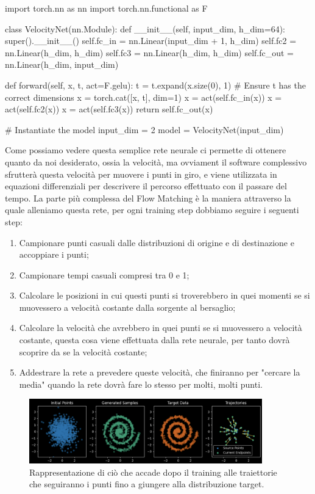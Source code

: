 \begin{python}[frame=trBL]
import torch.nn as nn
import torch.nn.functional as F

class VelocityNet(nn.Module):
    def __init__(self, input_dim, h_dim=64):
        super().__init__()
        self.fc_in  = nn.Linear(input_dim + 1, h_dim)
        self.fc2    = nn.Linear(h_dim, h_dim)
        self.fc3    = nn.Linear(h_dim, h_dim)
        self.fc_out = nn.Linear(h_dim, input_dim)
    
    def forward(self, x, t, act=F.gelu):
        t = t.expand(x.size(0), 1)  
        # Ensure t has the correct dimensions
        x = torch.cat([x, t], dim=1)
        x = act(self.fc_in(x))
        x = act(self.fc2(x))
        x = act(self.fc3(x))
        return self.fc_out(x)

# Instantiate the model
input_dim = 2
model = VelocityNet(input_dim)
\end{python}


Come possiamo vedere questa semplice rete neurale ci permette di ottenere quanto da noi desiderato, ossia la velocità, ma ovviament il software complessivo sfrutterà questa velocità per muovere i punti in giro, e viene utilizzata in equazioni differenziali per descrivere il percorso effettuato con il passare del tempo. La parte più complessa del Flow Matching è la maniera attraverso la quale alleniamo questa rete, per ogni training step dobbiamo seguire i seguenti step:

\begin{enumerate}
    \item Campionare punti casuali dalle distribuzioni di origine e di destinazione e accoppiare i punti;
    \item Campionare tempi casuali compresi tra 0 e 1;
    \item  Calcolare le posizioni in cui questi punti si troverebbero in quei momenti se si muovessero a velocità costante dalla sorgente al bersaglio;
    \item Calcolare la velocità che avrebbero in quei punti se si muovessero a velocità costante, questa cosa viene effettuata dalla rete neurale, per tanto dovrà scoprire da se la velocità costante;
    \item Addestrare la rete a prevedere queste velocità, che finiranno per "cercare la media" quando la rete dovrà fare lo stesso per molti, molti punti.
\end{enumerate}

\begin{figure}
    \centering
    \includegraphics[width=0.9\textwidth]{figure/TrajFM}
    \caption{Rappresentazione di ciò che accade dopo il training alle traiettorie che seguiranno i punti fino a giungere alla distribuzione target.}
    \label{fig:trajFM}
\end{figure}


